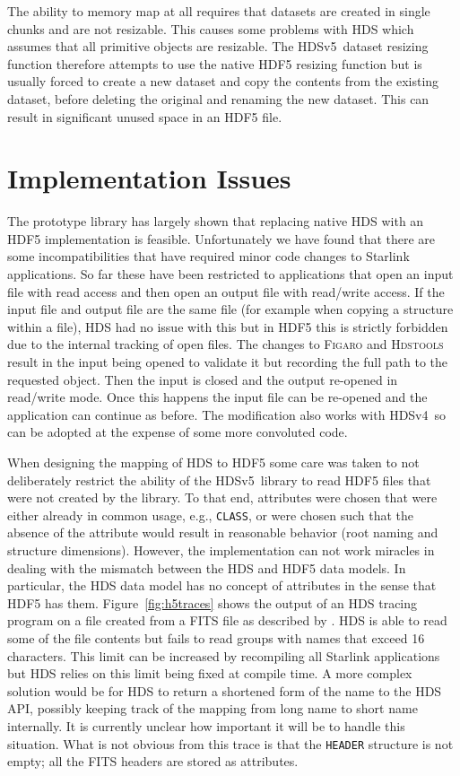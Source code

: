 \documentclass[final,authoryear,5p,times,twocolumn]{elsarticle}
\newcommand{\new}{HDSv5}
\newcommand{\old}{HDSv4}
\begin{document}
The ability to memory map at all requires that datasets are created in
single chunks and are not resizable. This causes some problems with
HDS which assumes that all primitive objects are resizable. The \new\
dataset resizing function therefore attempts to use the native
HDF5 resizing function but is usually forced to create a new dataset
and copy the contents from the existing dataset, before deleting the
original and renaming the new dataset. This can result in significant
unused space in an HDF5 file.

\section{Implementation Issues}

The prototype library has largely shown that replacing native HDS with
an HDF5 implementation is feasible. Unfortunately we have found that
there are some incompatibilities that have required minor code changes
to Starlink applications. So far these have been restricted to
applications that open an input file with read access and then open an
output file with read/write access. If the input file and output file
are the same file (for example when copying a structure within a
file), HDS had no issue with this but in HDF5 this is strictly
forbidden due to the internal tracking of open files. The changes to
\textsc{Figaro} \citep[][\ascl{1411.022}]{1993ASPC...52..219S} and
\textsc{Hdstools} \citep{SUN245} result in the input being opened to
validate it but recording the full path to the requested object. Then
the input is closed and the output re-opened in read/write mode. Once
this happens the input file can be re-opened and the application can
continue as before. The modification also works with \old\ so can be
adopted at the expense of some more convoluted code.

When designing the mapping of HDS to HDF5 some care was taken to not
deliberately restrict the ability of the \new\ library to read HDF5
files that were not created by the library. To that end, attributes
were chosen that were either already in common usage, e.g.,
\texttt{CLASS}, or were chosen such that the absence of the attribute
would result in reasonable behavior (root naming and structure
dimensions). However, the implementation can not work miracles in
dealing with the mismatch between the HDS and HDF5 data models.
In particular, the HDS data model has no concept of attributes
in the sense that HDF5 has them. Figure~\ref{fig:h5traces} shows the
output of an HDS tracing program on a file created from a FITS file
as described by \citet{O4-4_adassxxiv}. HDS is able to read some of
the file contents but fails to read groups with names that exceed 16
characters. This limit can be increased by recompiling all Starlink
applications but HDS relies on this limit being fixed at compile time.
A more complex solution would be for HDS to return a shortened form of
the name to the HDS API, possibly keeping track of the mapping from
long name to short name internally. It is currently unclear how
important it will be to handle this situation. What is not obvious
from this trace is that the \texttt{HEADER} structure is not empty;
all the FITS headers are stored as attributes.
\end{document}
